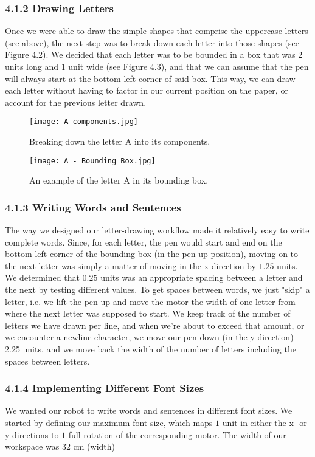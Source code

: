\documentclass[letterpaper]{article}
\begin{document}
\subsubsection{4.1.2 Drawing Letters\\}
Once we were able to draw the simple shapes that comprise the uppercase letters (see above), the next step was to break down each letter into those shapes (see Figure 4.2). We decided that each letter was to be bounded in a box that was $2$ units long and $1$ unit wide (see Figure 4.3), and that we can assume that the pen will always start at the bottom left corner of said box. This way, we can draw each letter without having to factor in our current position on the paper, or account for the previous letter drawn.
\begin{figure}[http]
    \centering
    \texttt{[image: A components.jpg]}
    \caption*{Breaking down the letter A into its components.}
    \label{fig:4.2}
\end{figure}
\begin{figure}[http]
    \centering
    \texttt{[image: A - Bounding Box.jpg]}
    \caption*{An example of the letter A in its bounding box.}
    \label{fig:4.3}
\end{figure}
\subsubsection{4.1.3 Writing Words and Sentences}
The way we designed our letter-drawing workflow made it relatively easy to write complete words. Since, for each letter, the pen would start and end on the bottom left corner of the bounding box (in the pen-up position), moving on to the next letter was simply a matter of moving in the x-direction by $1.25$ units. We determined that $0.25$ units was an appropriate spacing between a letter and the next by testing different values. To get spaces between words, we just "skip" a letter, i.e. we lift the pen up and move the motor the width of one letter from where the next letter was supposed to start. We keep track of the number of letters we have drawn per line, and when we're about to exceed that amount, or we encounter a newline character, we move our pen down (in the y-direction) 2.25 units, and we move back the width of the number of letters including the spaces between letters.
%
\subsubsection{4.1.4 Implementing Different Font Sizes}
We wanted our robot to write words and sentences in different font sizes. We started by defining our maximum font size, which maps $1$ unit in either the x- or y-directions to $1$ full rotation of the corresponding motor. The width of our workspace was 32 cm (width)
\end{document}
